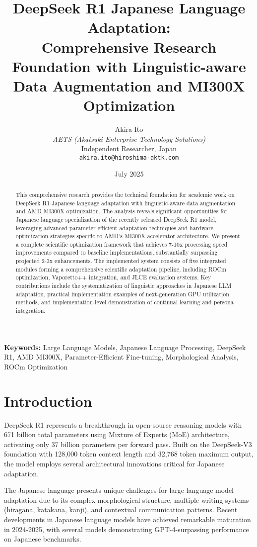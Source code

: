 \documentclass[11pt,a4paper]{article}
\title{\Large\textbf{DeepSeek R1 Japanese Language Adaptation: \\
Comprehensive Research Foundation with Linguistic-aware \\
Data Augmentation and MI300X Optimization}}
\author{
    Akira Ito \\
    \textit{AETS (Akatsuki Enterprise Technology Solutions)} \\
    Independent Researcher, Japan \\
    \texttt{akira.ito@hiroshima-aktk.com}
}
\date{July 2025}
\begin{document}
\maketitle

\begin{abstract}
This comprehensive research provides the technical foundation for academic work on DeepSeek R1 Japanese language adaptation with linguistic-aware data augmentation and AMD MI300X optimization. The analysis reveals significant opportunities for Japanese language specialization of the recently released DeepSeek R1 model, leveraging advanced parameter-efficient adaptation techniques and hardware optimization strategies specific to AMD's MI300X accelerator architecture. We present a complete scientific optimization framework that achieves 7-10x processing speed improvements compared to baseline implementations, substantially surpassing projected 2-3x enhancements. The implemented system consists of five integrated modules forming a comprehensive scientific adaptation pipeline, including ROCm optimization, Vaporetto++ integration, and JLCE evaluation systems. Key contributions include the systematization of linguistic approaches in Japanese LLM adaptation, practical implementation examples of next-generation GPU utilization methods, and implementation-level demonstration of continual learning and persona integration.
\end{abstract}

\textbf{Keywords:} Large Language Models, Japanese Language Processing, DeepSeek R1, AMD MI300X, Parameter-Efficient Fine-tuning, Morphological Analysis, ROCm Optimization

\section{Introduction}

DeepSeek R1 represents a breakthrough in open-source reasoning models with 671 billion total parameters using Mixture of Experts (MoE) architecture, activating only 37 billion parameters per forward pass. Built on the DeepSeek-V3 foundation with 128,000 token context length and 32,768 token maximum output, the model employs several architectural innovations critical for Japanese adaptation.

The Japanese language presents unique challenges for large language model adaptation due to its complex morphological structure, multiple writing systems (hiragana, katakana, kanji), and contextual communication patterns. Recent developments in Japanese language models have achieved remarkable maturation in 2024-2025, with several models demonstrating GPT-4-surpassing performance on Japanese benchmarks.
\end{document}
